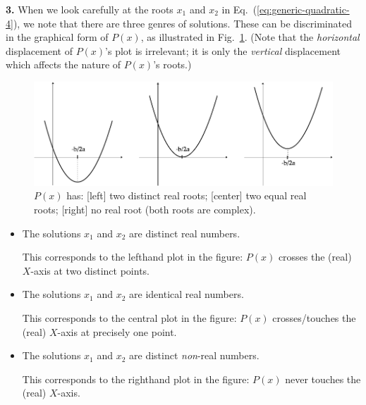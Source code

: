 {\bf 3.}
When we look carefully at the roots $x_1$ and $x_2$ in Eq.~(\ref{eq:generic-quadratic-4}), we note that there are three genres of solutions.  These can be discriminated in the graphical form of
$P(x)$, as illustrated in Fig.~\ref{fig:SecondDegreeInit}.  (Note that the {\em horizontal} displacement of $P(x)$'s plot is irrelevant; it is only the {\em vertical} displacement which affects the nature of $P(x)$'s roots.)
\begin{figure}[htb]
\begin{center}
       \includegraphics[scale=0.325]{FiguresArithmetic/SecondDegreeInit}
\caption{$P(x)$ has: [left] two distinct real roots; [center] two equal real roots; [right] no real root (both roots are complex).}
\label{fig:SecondDegreeInit}
\end{center}
\end{figure}
\begin{itemize}
\item
The solutions $x_1$ and $x_2$ are distinct real numbers.

\smallskip

This corresponds to the lefthand plot in the figure: $P(x)$ crosses the (real) $X$-axis at two distinct points.

\medskip\item
The solutions $x_1$ and $x_2$ are identical real numbers.

\smallskip

This corresponds to the central plot in the figure: $P(x)$ crosses/touches the (real) $X$-axis at precisely one point.

\medskip\item
The solutions $x_1$ and $x_2$ are distinct {\em non}-real numbers.

\smallskip

This corresponds to the righthand plot in the figure: $P(x)$ never touches the (real) $X$-axis.
\end{itemize}

